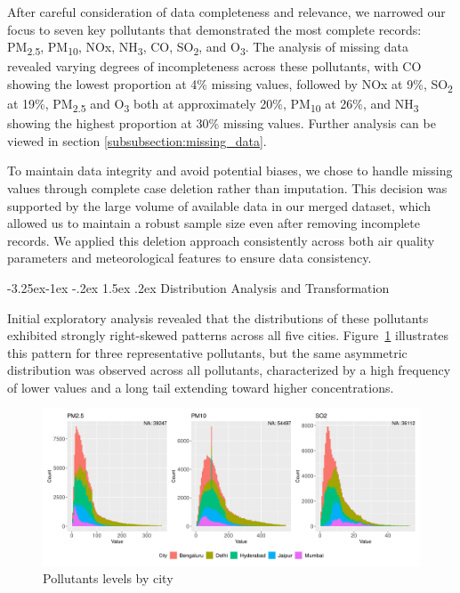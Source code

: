 \documentclass[twoside,11pt]{article}
\makeatletter
\renewcommand\subsubsection{\@startsection{subsubsection}{3}{\z@}%
  {-3.25ex\@plus -1ex \@minus -.2ex}%
  {1.5ex \@plus .2ex}%
  {\normalfont\bfseries\normalsize}}
\makeatother
\begin{document}
After careful consideration of data completeness and relevance, we narrowed our focus to seven key pollutants that demonstrated the most complete records: PM\textsubscript{2.5}, PM\textsubscript{10}, NOx, NH\textsubscript{3}, CO, SO\textsubscript{2}, and O\textsubscript{3}. The analysis of missing data revealed varying degrees of incompleteness across these pollutants, with CO showing the lowest proportion at 4\% missing values, followed by NOx at 9\%, SO\textsubscript{2} at 19\%, PM\textsubscript{2.5} and O\textsubscript{3} both at approximately 20\%, PM\textsubscript{10} at 26\%, and NH\textsubscript{3} showing the highest proportion at 30\% missing values. Further analysis can be viewed in section \ref{subsubsection:missing_data}.

To maintain data integrity and avoid potential biases, we chose to handle missing values through complete case deletion rather than imputation. This decision was supported by the large volume of available data in our merged dataset, which allowed us to maintain a robust sample size even after removing incomplete records. We applied this deletion approach consistently across both air quality parameters and meteorological features to ensure data consistency.

\subsubsection{Distribution Analysis and Transformation}

Initial exploratory analysis revealed that the distributions of these pollutants exhibited strongly right-skewed patterns across all five cities. Figure~\ref{fig:skewness} illustrates this pattern for three representative pollutants, but the same asymmetric distribution was observed across all pollutants, characterized by a high frequency of lower values and a long tail extending toward higher concentrations.

\begin{figure}[H]
  \centering
  \includegraphics[width=\textwidth]{assets/skewness.png}
  \caption{Pollutants levels by city}
  \label{fig:skewness}
\end{figure}
\end{document}
